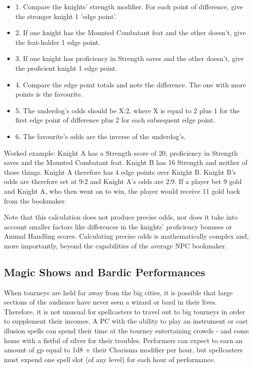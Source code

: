 \documentclass[10pt,a4paper,twoside,bg=print,twocolumn,openany,nodeprecatedcode]{dndbook}
\begin{document}
\begin{itemize}
\item 1. Compare the knights' strength modifier. For each point of difference, give the stronger knight 1 'edge point'.
\item 2. If one knight has the Mounted Combatant feat and the other doesn't, give the feat-holder 1 edge point.
\item 3. If one knight has proficiency in Strength saves and the other doesn't, give the proficient knight 1 edge point.
\item 4. Compare the edge point totals and note the difference. The one with more points is the favourite.
\item 5. The underdog's odds should be X:2, where X is equal to 2 plus 1 for the first edge point of difference plus 2 for each subsequent edge point.
\item 6. The favourite's odds are the inverse of the underdog's.
\end{itemize}

\begin{DndSidebar}[float=!b]{}
Worked example: Knight A has a Strength score of 20, proficiency in Strength saves and the Mounted Combatant feat. Knight B has 16 Strength and neither of those things. Knight A therefore has 4 edge points over Knight B. Knight B's odds are therefore set at 9:2 and Knight A's odds are 2:9. If a player bet 9 gold and Knight A, who then went on to win, the player would receive 11 gold back from the bookmaker.



\end{DndSidebar}

Note that this calculation does not produce precise odds, nor does it take into account smaller factors like differences in the knights' proficiency bonuses or Animal Handling scores. Calculating precise odds is mathematically complex and, more importantly, beyond the capabilities of the average NPC bookmaker.

\subsection{Magic Shows and Bardic Performances}
When tourneys are held far away from the big cities, it is possible that large sections of the audience have never seen a wizard or bard in their lives. Therefore, it is not unusual for spellcasters to travel out to big tourneys in order to supplement their incomes. A PC with the ability to play an instrument or cast illusion spells can spend their time at the tourney entertaining crowds - and come home with a fistful of silver for their troubles. Performers can expect to earn an amount of gp equal to 1d8 + their Charisma modifier per hour, but spellcasters must expend one spell slot (of any level) for each hour of performance.
\end{document}
